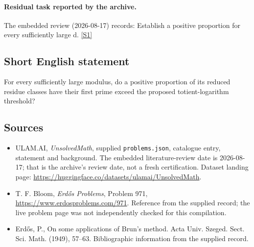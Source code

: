 \documentclass[11pt,a4paper]{article}
\newcommand{\sref}[2]{\hyperlink{source:#1:#2}{[S#2]}}
\begin{document}
\paragraph{Residual task reported by the archive.}

The embedded review (2026-08-17) records: Establish a positive proportion for every sufficiently large d. \sref{statement}{1}

\subsection{Short English statement}

For every sufficiently large modulus, do a positive proportion of its reduced residue classes have their first prime exceed the proposed totient-logarithm threshold?

\subsection{Sources}

{\small

\begin{itemize}

\item[\hypertarget{source:statement:1}{S1}] ULAM.AI, \emph{UnsolvedMath}, supplied \texttt{problems.json}, catalogue entry, statement and background. The embedded literature-review date is 2026-08-17; that is the archive’s review date, not a fresh certification. Dataset landing page: \url{https://huggingface.co/datasets/ulamai/UnsolvedMath}.

\item[\hypertarget{source:statement:2}{S2}] T. F. Bloom, \emph{Erdős Problems}, Problem 971, \url{https://www.erdosproblems.com/971}. Reference from the supplied record; the live problem page was not independently checked for this compilation.

\item[\hypertarget{source:statement:3}{S3}] Erd\H{o}s, P., On some applications of {B}run's method. Acta Univ. Szeged. Sect. Sci. Math. (1949), 57--63. Bibliographic information from the supplied record.

\end{itemize}

}

\label{end:statement}
\end{document}
